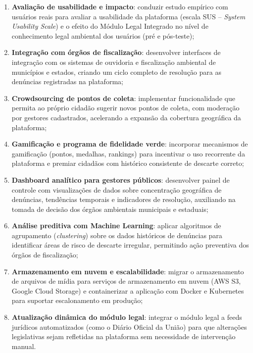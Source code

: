 \documentclass[12pt, a4paper]{article}
\numberwithin{equation}{section}
\numberwithin{figure}{section}
\numberwithin{table}{section}
\begin{document}
\begin{enumerate}
  \item \textbf{Avaliação de usabilidade e impacto}: conduzir estudo empírico
        com usuários reais para avaliar a usabilidade da plataforma (escala
        SUS -- \textit{System Usability Scale}) e o efeito do Módulo Legal
        Integrado no nível de conhecimento legal ambiental dos usuários (pré e
        pós-teste);

  \item \textbf{Integração com órgãos de fiscalização}: desenvolver interfaces
        de integração com os sistemas de ouvidoria e fiscalização ambiental de
        municípios e estados, criando um ciclo completo de resolução para as
        denúncias registradas na plataforma;

  \item \textbf{Crowdsourcing de pontos de coleta}: implementar funcionalidade
        que permita ao próprio cidadão sugerir novos pontos de coleta, com
        moderação por gestores cadastrados, acelerando a expansão da cobertura
        geográfica da plataforma;

  \item \textbf{Gamificação e programa de fidelidade verde}: incorporar
        mecanismos de gamificação (pontos, medalhas, rankings) para incentivar
        o uso recorrente da plataforma e premiar cidadãos com histórico
        consistente de descarte correto;

  \item \textbf{Dashboard analítico para gestores públicos}: desenvolver painel
        de controle com visualizações de dados sobre concentração geográfica de
        denúncias, tendências temporais e indicadores de resolução, auxiliando
        na tomada de decisão dos órgãos ambientais municipais e estaduais;

  \item \textbf{Análise preditiva com Machine Learning}: aplicar algoritmos de
        agrupamento (\textit{clustering}) sobre os dados históricos de denúncias
        para identificar áreas de risco de descarte irregular, permitindo ação
        preventiva dos órgãos de fiscalização;

  \item \textbf{Armazenamento em nuvem e escalabilidade}: migrar o armazenamento
        de arquivos de mídia para serviços de armazenamento em nuvem (AWS S3,
        Google Cloud Storage) e containerizar a aplicação com Docker e
        Kubernetes para suportar escalonamento em produção;

  \item \textbf{Atualização dinâmica do módulo legal}: integrar o módulo legal
        a feeds jurídicos automatizados (como o Diário Oficial da União) para
        que alterações legislativas sejam refletidas na plataforma sem
        necessidade de intervenção manual.
\end{enumerate}
\end{document}
